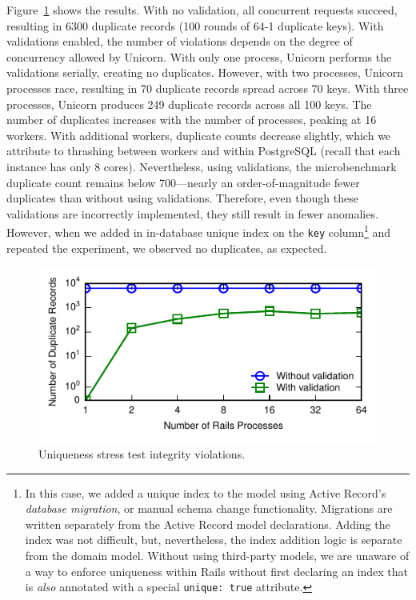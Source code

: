 Figure~\ref{fig:pk-stress} shows the results. With no validation, all
concurrent requests succeed, resulting in 6300 duplicate records (100
rounds of 64-1 duplicate keys). With validations enabled, the number
of violations depends on the degree of concurrency allowed by
Unicorn. With only one process, Unicorn performs the validations
serially, creating no duplicates. However, with two processes, Unicorn
processes race, resulting in 70 duplicate records spread across 70
keys. With three processes, Unicorn produces 249 duplicate records
across all 100 keys. The number of duplicates increases with the
number of processes, peaking at 16 workers. With additional workers,
duplicate counts decrease slightly, which we attribute to thrashing
between workers and within PostgreSQL (recall that each instance has
only 8 cores). Nevertheless, using validations, the microbenchmark
duplicate count remains below 700---nearly an order-of-magnitude fewer
duplicates than without using validations. Therefore, even though
these validations are incorrectly implemented, they still
result in fewer anomalies. However, when we added in in-database
unique index on the \texttt{key} column\footnote{In this case, we
  added a unique index to the model using Active Record's
  \textit{database migration}, or manual schema change
  functionality. Migrations are written separately from the Active
  Record model declarations. Adding the index was not difficult, but,
  nevertheless, the index addition logic is separate from the domain
  model. Without using third-party models, we are unaware of a way to
  enforce uniqueness within Rails without first declaring an index
  that is \textit{also} annotated with a special \texttt{unique: true}
  attribute.} and repeated the experiment, we observed no duplicates,
as expected.

\begin{figure}
\includegraphics[width=\figscale\columnwidth]{figs/pk_stress_violations.pdf}
\caption{Uniqueness stress test integrity violations.}
\label{fig:pk-stress}
\end{figure} 

